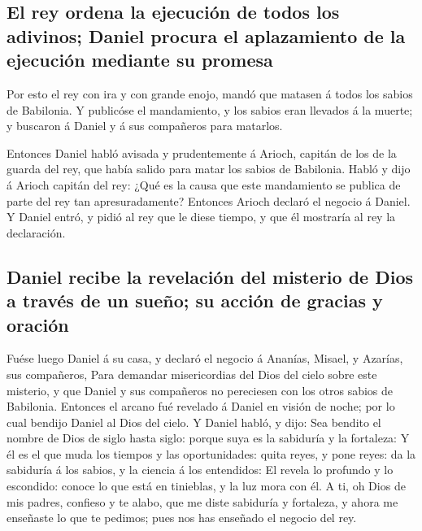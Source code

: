 \hypertarget{el-rey-ordena-la-ejecuciuxf3n-de-todos-los-adivinos-daniel-procura-el-aplazamiento-de-la-ejecuciuxf3n-mediante-su-promesa}{%
\subsection{El rey ordena la ejecución de todos los adivinos; Daniel
procura el aplazamiento de la ejecución mediante su
promesa}\label{el-rey-ordena-la-ejecuciuxf3n-de-todos-los-adivinos-daniel-procura-el-aplazamiento-de-la-ejecuciuxf3n-mediante-su-promesa}}

 Por esto el rey con ira y con grande enojo, mandó que
matasen á todos los sabios de Babilonia.  Y publicóse el
mandamiento, y los sabios eran llevados á la muerte; y buscaron á Daniel
y á sus compañeros para matarlos.

 Entonces Daniel habló avisada y prudentemente á Arioch,
capitán de los de la guarda del rey, que había salido para matar los
sabios de Babilonia.  Habló y dijo á Arioch capitán del
rey: ¿Qué es la causa que este mandamiento se publica de parte del rey
tan apresuradamente? Entonces Arioch declaró el negocio á Daniel.
 Y Daniel entró, y pidió al rey que le diese tiempo, y que
él mostraría al rey la declaración.

\hypertarget{daniel-recibe-la-revelaciuxf3n-del-misterio-de-dios-a-travuxe9s-de-un-sueuxf1o-su-acciuxf3n-de-gracias-y-oraciuxf3n}{%
\subsection{Daniel recibe la revelación del misterio de Dios a través de
un sueño; su acción de gracias y
oración}\label{daniel-recibe-la-revelaciuxf3n-del-misterio-de-dios-a-travuxe9s-de-un-sueuxf1o-su-acciuxf3n-de-gracias-y-oraciuxf3n}}

 Fuése luego Daniel á su casa, y declaró el negocio á
Ananías, Misael, y Azarías, sus compañeros,  Para demandar
misericordias del Dios del cielo sobre este misterio, y que Daniel y sus
compañeros no pereciesen con los otros sabios de Babilonia.
 Entonces el arcano fué revelado á Daniel en visión de
noche; por lo cual bendijo Daniel al Dios del cielo.  Y
Daniel habló, y dijo: Sea bendito el nombre de Dios de siglo hasta
siglo: porque suya es la sabiduría y la fortaleza:  Y él es
el que muda los tiempos y las oportunidades: quita reyes, y pone reyes:
da la sabiduría á los sabios, y la ciencia á los entendidos:
 El revela lo profundo y lo escondido: conoce lo que está
en tinieblas, y la luz mora con él.  A ti, oh Dios de mis
padres, confieso y te alabo, que me diste sabiduría y fortaleza, y ahora
me enseñaste lo que te pedimos; pues nos has enseñado el negocio del
rey.

